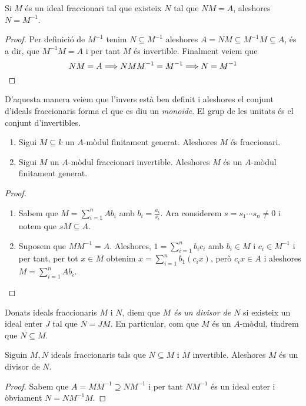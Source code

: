 \documentclass[../../../main.tex]{subfiles}
\begin{document}
\begin{prop}
\label{prop:idealFraccionariInversUnic} Si $M$ és un ideal fraccionari tal que existeix $N$ tal que $NM = A$, aleshores $N=M^{-1}$.
\end{prop}
\begin{proof}
Per definició de $M^{-1}$ tenim $N\subseteq M^{-1}$ aleshores $A = NM\subseteq M^{-1}M\subseteq A$, és a dir, que $M^{-1}M = A$ i per tant $M$ és invertible. Finalment veiem que
\begin{equation}
        \notag
        NM = A\Longrightarrow NMM^{-1} = M^{-1}\Longrightarrow N=M^{-1}
\end{equation}
\end{proof}


D'aquesta manera veiem que l'invers està ben definit i aleshores el conjunt d'ideals fraccionaris forma el que es diu un \textit{monoide}. El grup de les unitats és el conjunt d'invertibles. 

\begin{prop}
\label{prop:fraccionariFinitamentGenerat}
\begin{enumerate}[(1)]
    \item Sigui $M\subseteq k$ un $A$-mòdul finitament generat. Aleshores $M$ és fraccionari.
    \item Sigui $M$ un $A$-mòdul fraccionari invertible. Aleshores $M$ és un $A$-mòdul finitament generat.
\end{enumerate}
\end{prop}
\begin{proof}
\begin{enumerate}[(1)]
    \item Sabem que $M = \sum_{i=1}^nAb_i$ amb $b_i=\frac{a_i}{s_i}$. Ara considerem $s = s_1\cdots s_n\not=0$ i notem que $sM\subseteq A$.
    \item Suposem que $MM^{-1} = A$. Aleshores, $1 = \sum_{i=1}^nb_ic_i$ amb $b_i\in M$ i $c_i\in M^{-1}$ i per tant, per tot $x\in M$ obtenim $x = \sum_{i=1}^nb_1(c_ix)$, però $c_ix\in A$ i aleshores $M =\sum_{i=1}^nAb_i$.
\end{enumerate}
\end{proof}

\begin{defi}
\label{def:modulsDivisors} Donats ideals fraccionaris $M$ i $N$, diem que \textit{$M$ és un divisor de $N$} si existeix un ideal enter $J$ tal que $N = JM$. En particular, com que $M$ és un $A$-mòdul, tindrem que $N\subseteq M$.
\end{defi}


\begin{prop}
\label{prop:fraccionarisInvertibleDivisors} Siguin $M,N$ ideals fraccionaris tals que $N\subseteq M$ i $M$ invertible. Aleshores $M$ és un divisor de $N$.
\end{prop}
\begin{proof}
Sabem que $A = MM^{-1}\supseteq NM^{-1}$ i per tant $NM^{-1}$ és un ideal enter i òbviament $N = NM^{-1}M$.
\end{proof}
\end{document}
